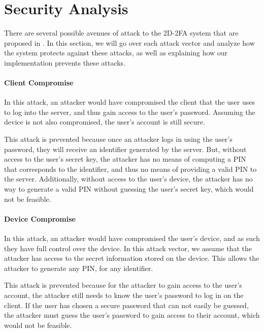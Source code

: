 \documentclass[11pt]{article}
\begin{document}
\section{Security Analysis}

There are several possible avenues of attack to the 2D-2FA system that
are proposed in \cite{shirvanian2d2fa}. In this section, we will go over
each attack vector and analyze how the system protects against these
attacks, as well as explaining how our implementation prevents these
attacks. 

\paragraph{Client Compromise}
In this attack, an attacker would have compromised the client that the
user uses to log into the server, and thus gain access to the user's
password. Assuming the device is not also compromised, the user's
account is still secure. 

This attack is prevented because once an attacker logs in using the
user's password, they will receive an identifier generated by the
server. But, without access to the user's secret key, the attacker has
no means of computing a PIN that corresponds to the identifier, and
thus no means of providing a valid PIN to the server. Additionally,
without access to the user's device, the attacker has no way to generate
a valid PIN without guessing the user's secret key, which would not be
feasible. 


\paragraph{Device Compromise}
In this attack, an attacker would have compromised the user's device,
and as such they have full control over the device. In this attack
vector, we assume that the attacker has access to the secret information
stored on the device. This allows the attacker to generate any PIN, for
any identifier.

This attack is prevented because for the attacker to gain access to the
user's account, the attacker still needs to know the user's password to
log in on the client. If the user has chosen a secure password that can
not easily be guessed, the attacker must guess the user's password to
gain access to their account, which would not be feasible. 
\end{document}
